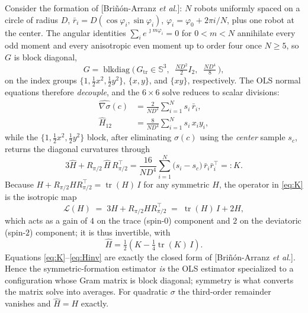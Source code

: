 \documentclass[journal]{IEEEtran}
\newcommand{\Sym}{\mathbb{S}}
\newcommand{\Rp}{R_{\pi/2}}
\newcommand{\tr}{\operatorname{tr}}
\begin{document}
Consider the formation of [Bri\~n\'on-Arranz \emph{et al.}]: $N$ robots uniformly
spaced on a circle of radius $D$, $\bar r_{i}=D(\cos\varphi_{i},\sin\varphi_{i})$,
$\varphi_{i}=\varphi_{0}+2\pi i/N$, plus one robot at the center. The angular
identities $\sum_{i}e^{\,\jmath m\varphi_{i}}=0$ for $0<m<N$ annihilate every odd
moment and every anisotropic even moment up to order four once $N\ge5$, so $G$ is
block diagonal,
\begin{equation}
G=\operatorname{blkdiag}\!\Big(\,G_{\mathrm{tr}}\in\Sym^{3},\;\;
\tfrac{ND^{2}}{2}I_{2},\;\;\tfrac{ND^{4}}{8}\,\Big),
\end{equation}
on the index groups $\{1,\tfrac12x^{2},\tfrac12y^{2}\}$, $\{x,y\}$, and $\{xy\}$,
respectively. The OLS normal equations therefore \emph{decouple}, and the $6\times6$
solve reduces to scalar divisions:
\begin{align}
\widehat{\nabla\sigma}(c) &= \frac{2}{ND^{2}}\sum_{i=1}^{N} s_{i}\,\bar r_{i}, \\
\widehat{H}_{12} &= \frac{8}{ND^{4}}\sum_{i=1}^{N} s_{i}\,x_{i}y_{i},
\end{align}
while the $\{1,\tfrac12x^{2},\tfrac12y^{2}\}$ block, after eliminating $\sigma(c)$
using the \emph{center} sample $s_{c}$, returns the diagonal curvatures through
\begin{equation}
\label{eq:K}
3\widehat{H}+\Rp\,\widehat{H}\,\Rp^{\!\top}
=\frac{16}{ND^{4}}\sum_{i=1}^{N}\big(s_{i}-s_{c}\big)\,\bar r_{i}\bar r_{i}^{\!\top}
=:K .
\end{equation}
Because $H+\Rp H\Rp^{\!\top}=\tr(H)\,I$ for any symmetric $H$, the operator in
\eqref{eq:K} is the isotropic map
\begin{equation}
\mathcal{L}(H)\;=\;3H+\Rp H\Rp^{\!\top}\;=\;\tr(H)\,I+2H,
\end{equation}
which acts as a gain of $4$ on the trace (spin-$0$) component and $2$ on the
deviatoric (spin-$2$) component; it is thus invertible, with
\begin{equation}
\label{eq:Hinv}
\widehat{H}=\tfrac12\!\left(K-\tfrac14\tr(K)\,I\right).
\end{equation}
Equations \eqref{eq:K}--\eqref{eq:Hinv} are exactly the closed form of
[Bri\~n\'on-Arranz \emph{et al.}]. Hence the symmetric-formation estimator
\emph{is} the OLS estimator specialized to a configuration whose Gram matrix is
block diagonal; symmetry is what converts the matrix solve into averages. For
quadratic $\sigma$ the third-order remainder vanishes and $\widehat{H}=H$ exactly.
\end{document}
